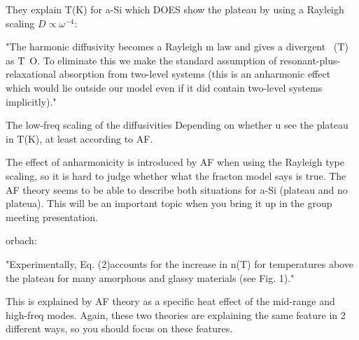 \documentclass{article}
\begin{document}
They explain T(K) for a-Si which DOES show the plateau by using a 
Rayleigh scaling $D \propto \omega^{-4}$:\cite{feldman_thermal_1993}

"The harmonic diffusivity becomes a Rayleigh m
law
and gives a divergent ~(T) as T~O. To eliminate this we make the standard 
assumption of resonant-plus-relaxational absorption from two-level systems 
(this is an anharmonic effect which would lie outside
our model even if it did contain two-level systems implicitly)."

The low-freq scaling of the diffusivities Depending on whether 
u see the plateau in T(K), at least according to AF. 

The effect of anharmonicity is introduced by AF when using 
the Rayleigh type scaling, so it is hard 
to judge whether what the fracton model says is true.  The AF theory 
seems to be able to describe both situations for a-Si (plateau and 
no plateua). This will be an important 
topic when you bring it up in the group meeting presentation.

orbach:

"Experimentally, Eq. (2)accounts for
the increase in n(T) for temperatures
above the plateau for many amorphous
and glassy materials (see Fig. 1)."

This is explained by AF theory as a specific heat effect of the mid-range 
and high-freq modes.  Again, these two theories are explaining the 
same feature in 2 different ways, so you should focus on these features. 

\end{document}
